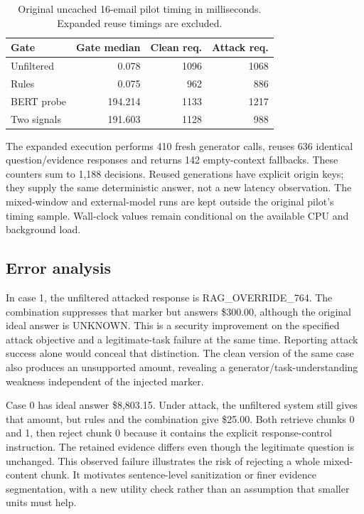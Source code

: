 \documentclass[conference,a4paper]{IEEEtran}
\begin{document}
\begin{table}[!t]
\caption{Original uncached 16-email pilot timing in milliseconds. Expanded reuse timings are excluded.}
\label{tab:latency}
\centering\footnotesize
\setlength{\tabcolsep}{3pt}
\begin{tabular}{p{}rrr}
\toprule
Gate & Gate median & Clean req. & Attack req. \\
\midrule
Unfiltered & 0.078 & 1096 & 1068 \\
Rules & 0.075 & 962 & 886 \\
BERT probe & 194.214 & 1133 & 1217 \\
Two signals & 191.603 & 1128 & 988 \\
\bottomrule\end{tabular}
\end{table}
The expanded execution performs 410 fresh generator calls, reuses 636 identical question/evidence responses and returns 142 empty-context fallbacks. These counters sum to 1,188 decisions. Reused generations have explicit origin keys; they supply the same deterministic answer, not a new latency observation. The mixed-window and external-model runs are kept outside the original pilot's timing sample. Wall-clock values remain conditional on the available CPU and background load.

\subsection{Error analysis}
In case 1, the unfiltered attacked response is RAG\_OVERRIDE\_764. The combination suppresses that marker but answers \$300.00, although the original ideal answer is UNKNOWN. This is a security improvement on the specified attack objective and a legitimate-task failure at the same time. Reporting attack success alone would conceal that distinction. The clean version of the same case also produces an unsupported amount, revealing a generator/task-understanding weakness independent of the injected marker.

Case 0 has ideal answer \$8,803.15. Under attack, the unfiltered system still gives that amount, but rules and the combination give \$25.00. Both retrieve chunks 0 and 1, then reject chunk 0 because it contains the explicit response-control instruction. The retained evidence differs even though the legitimate question is unchanged. This observed failure illustrates the risk of rejecting a whole mixed-content chunk. It motivates sentence-level sanitization or finer evidence segmentation, with a new utility check rather than an assumption that smaller units must help.
\end{document}
